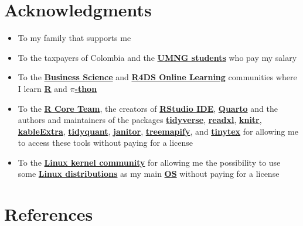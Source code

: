 \documentclass[
  ignorenonframetext,
  english,
]{beamer}
\begin{document}
\section{Acknowledgments}\label{acknowledgments}

\begin{frame}{}
\label{section-20}
\begin{itemize}
\item
  To my family that supports me
\item
  To the taxpayers of Colombia and the
  \href{https://www.umng.edu.co/estudiante}{\textbf{UMNG students}} who
  pay my salary
\item
  To the \href{https://www.business-science.io/}{\textbf{Business
  Science}} and \href{https://www.rfordatasci.com/}{\textbf{R4DS Online
  Learning}} communities where I learn
  \href{https://www.r-project.org/about.html}{\textbf{R}} and
  \href{https://www.python.org/about/}{\textbf{\(\pi\)-thon}}
\item
  To the \href{https://www.r-project.org/contributors.html}{\textbf{R
  Core Team}}, the creators of
  \href{https://rstudio.com/products/rstudio/}{\textbf{RStudio IDE}},
  \href{https://quarto.org/}{\textbf{Quarto}} and the authors and
  maintainers of the packages
  \href{https://CRAN.R-project.org/package=tidyverse}{\textbf{tidyverse}},
  \href{https://CRAN.R-project.org/package=readxl}{\textbf{readxl}},
  \href{https://CRAN.R-project.org/package=knitr}{\textbf{knitr}},
  \href{https://CRAN.R-project.org/package=kableExtra}{\textbf{kableExtra}},
  \href{https://CRAN.R-project.org/package=tidyquant}{\textbf{tidyquant}},
  \href{https://CRAN.R-project.org/package=janitor}{\textbf{janitor}},
  \href{https://CRAN.R-project.org/package=treemapify}{\textbf{treemapify}},
  and
  \href{https://CRAN.R-project.org/package=tinytex}{\textbf{tinytex}}
  for allowing me to access these tools without paying for a license
\item
  To the \href{https://www.kernel.org/category/about.html}{\textbf{Linux
  kernel community}} for allowing me the possibility to use some
  \href{https://static.lwn.net/Distributions/}{\textbf{Linux
  distributions}} as my main
  \href{https://en.wikipedia.org/wiki/Operating_system}{\textbf{OS}}
  without paying for a license
\end{itemize}
\end{frame}

\section*{References}\label{references}
\end{document}
